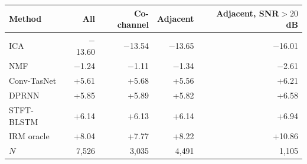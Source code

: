 \begin{tabular}{lrrrr}
\toprule
Method & All & Co-channel & Adjacent & Adjacent, SNR${>}20$~dB \\
\midrule
ICA & $-$13.60 & $-$13.54 & $-$13.65 & $-$16.01 \\
NMF & $-$1.24 & $-$1.11 & $-$1.34 & $-$2.61 \\
Conv-TasNet & +5.61 & +5.68 & +5.56 & +6.21 \\
DPRNN & +5.85 & +5.89 & +5.82 & +6.58 \\
STFT-BLSTM & +6.14 & +6.13 & +6.14 & +6.94 \\
\midrule
IRM oracle & +8.04 & +7.77 & +8.22 & +10.86 \\
$N$ & 7{,}526 & 3{,}035 & 4{,}491 & 1{,}105 \\
\bottomrule
\end{tabular}

